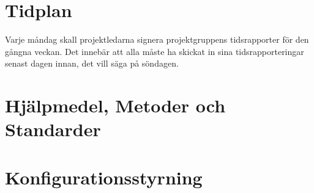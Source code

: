 ﻿\documentclass[a4paper]{article}
\begin{document}
\section{Tidplan}
\begin{comment} 
I tidplanen ska det finnas en detaljerad nedbrytning av det arbete som ska ske i aktiviteter. Det ska också finnas skattningar av arbetstid (dvs "effort"), ledtid och datum för när aktiviteter ska vara färdiga. Det betyder att man ska kunna utläsa minst följande: 

1. Skattad tidsåtgång för varje fas (hur fördelas arbetsinsatsen över projektets faser?)
2. Skattad start- och slutdatum för varje fas (när blir olika delar klara?)
3. Skattad tidsåtgång för varje dokument (vad kostar varje del?)
4. Skattad start- och slutdatum för varje dokument (när blir olika dokument klara?)
5. Skattad tidsåtgång för olika aktiviteter och aktivitetstyper i respektive fas (vad lägger man tiden på?). (Möten, granskningar, ändringshantering, rapportering, osv)
6. Skattad tidåtgång för varje grupp, uppdelat per vecka (går det in på en 40-timmarsvecka?)
7. En kalenderplan där man kan se vad varje grupp ska göra varje vecka (vem ska göra vad och när?) Detta kan tex åskådliggöras i ett gantt-schema.
8. Det ska även vara tydligt vilka möten som är planerade under projektet, både interna möten och möten där externa intressenter är med.

Ange även i projektplanen vilka metoder ni använt för att göra skattningar av tid och kostnad, samt vilka de största osäkerheterna är med skattningarna.

\end{comment}

Varje måndag skall projektledarna signera projektgruppens tidsrapporter för den gångna veckan. Det innebär att alla måste ha skickat in sina tidsrapporteringar senast dagen innan, det vill säga på söndagen. 

\section{Hjälpmedel, Metoder och Standarder}
\begin{comment}En beskrivning av ovanstående som projektet avser att använda.\end{comment}

\section{Konfigurationsstyrning}
\begin{comment}En beskrivning av konfigurationsstyrningen (CM), se kapitel 4 i röda boken. Konfigurationsstyrningen beskriver hur projektbiblioteket är organiserat och hur ändringshanteringen fungerar.


I samband med projektplanen är det också viktigt att tänka på att det i slutet av projektet skall skrivas en slutrapport. Detta betyder att man redan vid skrivandet av planen bör överväga hur slutrapporten skall se ut så att man enkelt kan stämma av med projektplanen.
\end{comment}
\end{document}
